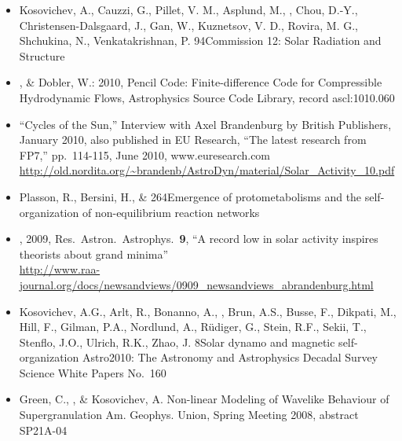 \begin{itemize}
\item[32.]
Kosovichev, A., Cauzzi, G., Pillet, V. M., Asplund, M., \Brandenburg, Chou, D.-Y., Christensen-Dalsgaard, J., Gan, W., Kuznetsov, V. D., Rovira, M. G., Shchukina, N., Venkatakrishnan, P.
{94}{Commission 12: Solar Radiation and Structure}

\item[31.]
\Brandenburg, \& Dobler, W.: 2010,
Pencil Code: Finite-difference Code for Compressible Hydrodynamic Flows,
Astrophysics Source Code Library, record ascl:1010.060

\item[30.]
``Cycles of the Sun,''
Interview with Axel Brandenburg by British Publishers, January 2010,
also published in EU Research, ``The latest research from FP7,''
pp.\ 114-115, June 2010, www.euresearch.com\\
\url{http://old.nordita.org/~brandenb/AstroDyn/material/Solar_Activity_10.pdf}%

\item[29.]
Plasson, R., Bersini, H., \& \Brandenburg{}
{264}{Emergence of protometabolisms and the self-organization of
non-equilibrium reaction networks}

\item[28.]
\Brandenburg, 2009, Res.\ Astron.\ Astrophys.\ {\bf 9},
``A record low in solar activity inspires theorists about grand minima''
\\
\url{http://www.raa-journal.org/docs/newsandviews/0909_newsandviews_abrandenburg.html}

\item[27.]
Kosovichev, A.G., Arlt, R., Bonanno, A., \Brandenburg, Brun,
A.S., Busse, F., Dikpati, M., Hill, F., Gilman, P.A., Nordlund, A.,
R\"udiger, G., Stein, R.F., Sekii, T., Stenflo, J.O., Ulrich, R.K.,
Zhao, J.
{8}{Solar dynamo and magnetic self-organization}
{Astro2010: The Astronomy and Astrophysics Decadal Survey}
{Science White Papers}
{No.\ 160}

\item[26.]
Green, C., \Brandenburg, \& Kosovichev, A.
{Non-linear Modeling of Wavelike Behaviour of Supergranulation}
{Am. Geophys. Union, Spring Meeting 2008, abstract SP21A-04}


\end{itemize}
